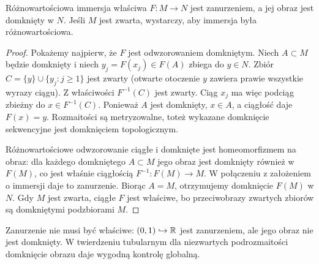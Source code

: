 \begin{stwierdzenie}
\label{prop:proper-immersja}
Różnowartościowa immersja właściwa $F:M\to N$
jest zanurzeniem, a jej obraz jest domknięty w $N$.
Jeśli $M$ jest zwarta, wystarczy, aby immersja
była różnowartościowa.
\end{stwierdzenie}
\begin{proof}
Pokażemy najpierw, że $F$ jest odwzorowaniem
domkniętym. Niech $A\subset M$ będzie domknięty
i niech $y_j=F(x_j)\in F(A)$ zbiega do $y\in N$.
Zbiór $C=\{y\}\cup\{y_j:j\geq1\}$ jest zwarty
(otwarte otoczenie $y$ zawiera prawie wszystkie
wyrazy ciągu). Z właściwości $F^{-1}(C)$ jest
zwarty. Ciąg $x_j$ ma więc podciąg zbieżny
do $x\in F^{-1}(C)$. Ponieważ $A$ jest domknięty,
$x\in A$, a ciągłość daje $F(x)=y$. Rozmaitości
są metryzowalne, toteż wykazane domknięcie
sekwencyjne jest domknięciem topologicznym.

Różnowartościowe odwzorowanie ciągłe i domknięte
jest homeomorfizmem na obraz: dla każdego
domkniętego $A\subset M$ jego obraz jest
domknięty również w $F(M)$, co jest właśnie
ciągłością $F^{-1}:F(M)\to M$. W połączeniu
z założeniem o immersji daje to zanurzenie.
Biorąc $A=M$, otrzymujemy domknięcie $F(M)$
w $N$. Gdy $M$ jest zwarta, ciągłe $F$
jest właściwe, bo przeciwobrazy zwartych
zbiorów są domkniętymi podzbiorami $M$.
\end{proof}

\begin{uwaga}
Zanurzenie nie musi być właściwe:
$(0,1)\hookrightarrow\mathbb{R}$ jest zanurzeniem,
ale jego obraz nie jest domknięty.
W twierdzeniu tubularnym dla niezwartych
podrozmaitości domknięcie obrazu daje wygodną
kontrolę globalną.
\end{uwaga}

